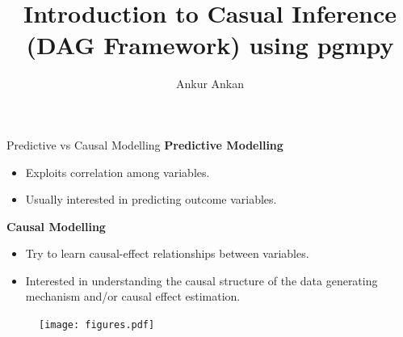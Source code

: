 \documentclass{beamer}
\begin{document}
\title[Causal Inference using pgmpy]{Introduction to Casual Inference (DAG Framework) using pgmpy}
\author{Ankur Ankan}
\date{}

\maketitle

\begin{frame}{Predictive vs Causal Modelling}
	\textbf{Predictive Modelling}
		\begin{itemize}
			\item Exploits correlation among variables.
			\item Usually interested in predicting outcome variables.
		\end{itemize}
	\vspace{1em}
	\textbf{Causal Modelling}
		\begin{itemize}
			\item Try to learn causal-effect relationships between variables.
			\item Interested in understanding the causal structure of the data generating mechanism and/or causal effect estimation.
		\end{itemize}

	\begin{figure}
		\centering
		\texttt{[image: figures.pdf]}
	\end{figure}
\end{frame}
\end{document}
